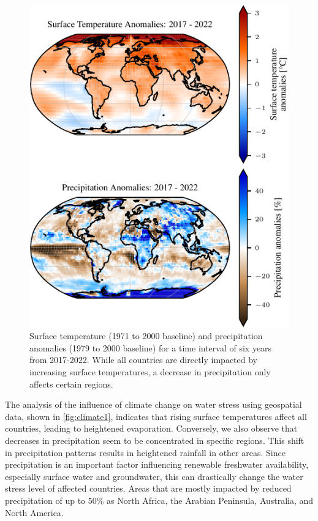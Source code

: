 \documentclass{article}
\theoremstyle{plain}
\theoremstyle{definition}
\theoremstyle{remark}
\begin{document}
\begin{figure}[!ht]
    \centering
    \includegraphics{fig/temp_precip_spatial.pdf}
    \caption{Surface temperature (1971 to 2000 baseline) and precipitation anomalies (1979 to 2000 baseline) for a time interval of six years from 2017-2022. While all countries are directly impacted by increasing surface temperatures, a decrease in precipitation only affects certain regions.}
    \label{fig:climate1}
\end{figure}
The analysis of the influence of climate change on water stress using geospatial data, shown in \autoref{fig:climate1}, indicates that rising surface temperatures affect all countries, leading to heightened evaporation. Conversely, we also observe that decreases in precipitation seem to be concentrated in specific regions. This shift in precipitation patterns results in heightened rainfall in other areas. Since precipitation is an important factor influencing renewable freshwater availability, especially surface water and groundwater, this can drastically change the water stress level of affected countries. Areas that are mostly impacted by reduced precipitation of up to 50\% as North Africa, the Arabian Peninsula, Australia, and North America.
\end{document}
